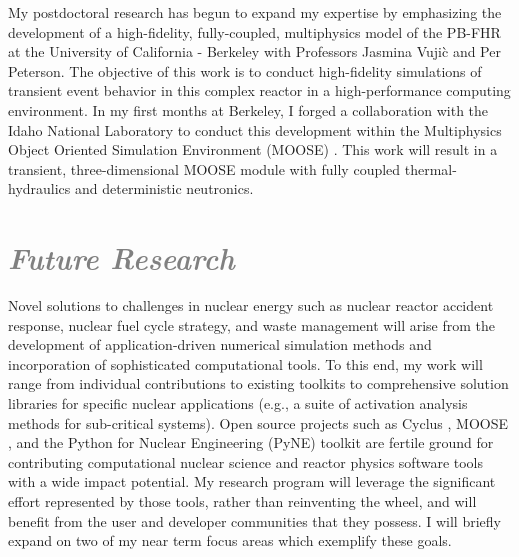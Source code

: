 \documentclass[a4paper, 10pt]{article}
\begin{document}
My postdoctoral research has begun to expand my expertise by emphasizing the 
development of a high-fidelity, fully-coupled, multiphysics model of the PB-FHR 
at the University of California - Berkeley with Professors Jasmina Vuji\`c and Per 
Peterson. The objective of this work is to conduct high-fidelity simulations of 
transient event behavior in this complex reactor in a high-performance computing 
environment.  In my first months at Berkeley, I forged a collaboration with the 
Idaho National Laboratory to conduct this development within the Multiphysics 
Object Oriented Simulation Environment (MOOSE) \cite{gaston_moose:_2009}. This 
work will result in a transient, three-dimensional MOOSE module with fully 
coupled thermal-hydraulics and deterministic neutronics.  



\section*{\textcolor{gray}{\it Future Research}}
Novel solutions to challenges in nuclear energy such as nuclear reactor accident 
response, nuclear fuel cycle strategy, and waste management will arise from the  
development of application-driven numerical simulation methods and incorporation 
of sophisticated computational tools. To this end, my work will range from 
individual contributions to existing toolkits to comprehensive solution 
libraries for specific nuclear applications (e.g., a suite of activation 
analysis methods for sub-critical systems). Open source projects such as 
Cyclus \cite{huff_cyclus_2011}, MOOSE \cite{gaston_moose:_2009}, and the Python 
for Nuclear Engineering (PyNE) toolkit \cite{pyne_pyne_2011} are fertile ground 
for contributing computational nuclear science and reactor physics software 
tools with a wide impact potential. My research program will leverage the 
significant effort represented by those tools, rather than reinventing the 
wheel, and will benefit from the user and developer communities that they 
possess.  I will briefly expand on two of my near term focus areas which 
exemplify these goals. 
\end{document}
